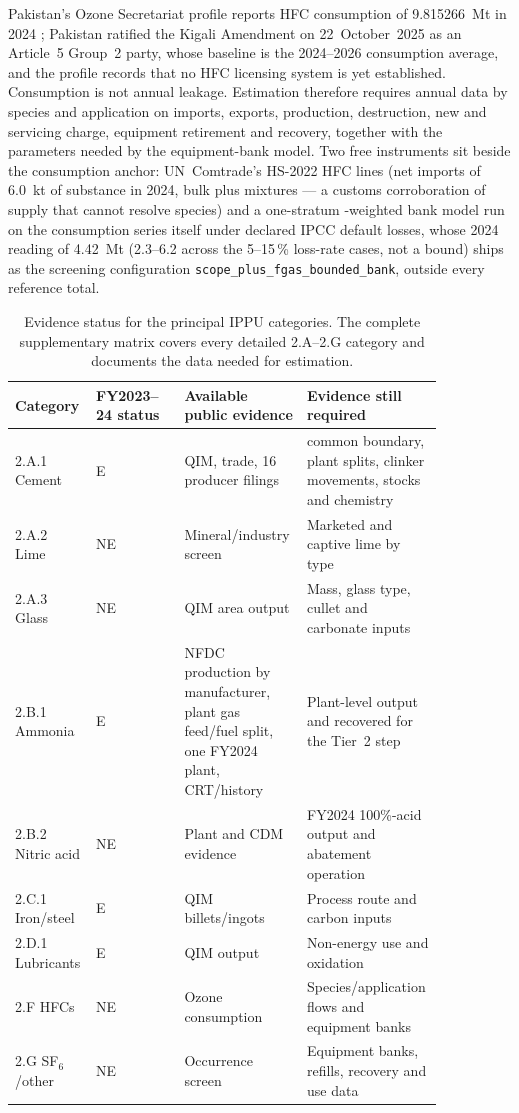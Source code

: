 Pakistan's Ozone Secretariat profile reports HFC consumption of
\SI{9.815266}{\mega\tonne} \COe{} in 2024 \citep{pakistanozoneprofile}; Pakistan ratified
the Kigali Amendment on 22~October~2025 as an Article~5 Group~2 party, whose baseline is the
2024--2026 consumption average, and the profile records that no HFC licensing system is yet
established. Consumption is not
annual leakage. Estimation therefore requires annual data by species and application on
imports, exports, production, destruction, new and servicing charge, equipment retirement and
recovery, together with the parameters needed by the equipment-bank model. Two
free instruments sit beside the consumption anchor: UN~Comtrade's HS-2022 HFC lines
(net imports of \SI{6.0}{\kilo\tonne} of substance in 2024, bulk plus mixtures --- a
customs corroboration of supply that cannot resolve species) and a one-stratum
\COe{}-weighted bank model run on the consumption series itself under declared IPCC
default losses, whose 2024 reading of \SI{4.42}{\mega\tonne} (2.3--6.2 across the
5--15\,\% loss-rate cases, not a bound) ships as the screening configuration
\texttt{scope\_plus\_fgas\_bounded\_bank}, outside every reference total.

\begin{table}[htbp]
\centering
\footnotesize
\begin{tabular}{@{}p{0.13\linewidth}p{0.20\linewidth}p{0.25\linewidth}p{0.27\linewidth}@{}}
\toprule
\textbf{Category} & \textbf{FY2023--24 status} & \textbf{Available public evidence} & \textbf{Evidence still required} \\
\midrule
2.A.1 Cement & E & QIM, trade, 16 producer filings & common boundary, plant splits, clinker movements, stocks and chemistry \\
2.A.2 Lime & NE & Mineral/industry screen & Marketed and captive lime by type \\
2.A.3 Glass & NE & QIM area output & Mass, glass type, cullet and carbonate inputs \\
2.B.1 Ammonia & E & NFDC production by manufacturer, plant gas feed/fuel split, one FY2024 plant, CRT/history & Plant-level output and recovered \COtwo{} for the Tier~2 step \\
2.B.2 Nitric acid & NE & Plant and CDM evidence & FY2024 100\%-acid output and abatement operation \\
2.C.1 Iron/steel & E & QIM billets/ingots & Process route and carbon inputs \\
2.D.1 Lubricants & E & QIM output & Non-energy use and oxidation \\
2.F HFCs & NE & Ozone consumption & Species/application flows and equipment banks \\
2.G SF$_6$/other & NE & Occurrence screen & Equipment banks, refills, recovery and use data \\
\bottomrule
\end{tabular}
\caption{Evidence status for the principal IPPU categories. The complete supplementary
matrix covers every detailed 2.A--2.G category and documents the data needed for estimation.}
\label{tab:completeness}
\end{table}
